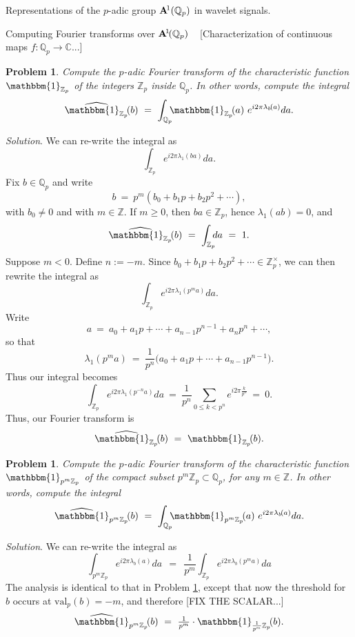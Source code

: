 \documentclass[letterpaper,11pt, reqno]{amsart}
\newtheorem{monodromy theorem}{Monodromy Theorem}[subsection]
\newtheorem{wild conjecture}[theorem]{Wild Conjecture}
\newtheorem{research objectives}{Research objectives}[subsection]
\newtheorem{research question}[theorem]{Research questions}
\newtheorem{aside question}[theorem]{Aside question}
\newtheorem{problem}[theorem]{Problem}
\newtheorem{audio example}[theorem]{\loudspeaker[3] Example}
\newtheorem{blank remark}[theorem]{}
\newtheorem{terminology and comment}[theorem]{Terminology and comment}
\newtheorem{purity hypothesis}[theorem]{Purity hypothesis}
\newtheorem{corollary of the purity hypothesis}[theorem]{Corollary of the purity hypothesis}
\newcommand{\CC} {{\mathbb C}}
\newcommand{\QQ} {{\mathbb Q}}
\newcommand{\ZZ} {{\mathbb Z}}
\newcommand{\lra}{{\longrightarrow}}
\numberwithin{equation}{theorem}
\begin{document}
\begin{section}{Representations of the $p$-adic group $\bold{A}^{\!1}(\mathbb{Q}_{p})$ in wavelet signals.}
\begin{subsection}{Computing Fourier transforms over $\bold{A}^{\!1\!}(\QQ_{p})$}
\ 
{\color{red} [Characterization of continuous maps $f:\QQ_{p}\lra\CC$...]}

\begin{problem}\label{problem: Fourier 1}
\normalfont
Compute the $p$-adic Fourier transform of the characteristic function $\mathbbm{1}_{\ZZ_p}$ of the integers $\ZZ_{p}$ inside $\QQ_{p}$. In other words, compute the integral
	$$\widehat{\mathbbm{1}_{\ZZ_{p}}}\!(b)
	\ =\ 
	\int_{\QQ_{p}}\!\!\!\mathbbm{1}_{\ZZ_{p}}\!(a)\ e^{i2\pi\lambda_{b\!}(a)}da.
	$$
\end{problem}

\noindent
{\em Solution}.
We can re-write the integral as
	$$
	\int_{\ZZ_{p}}e^{i2\pi\lambda_{1\!}(ba)}da.
	$$
Fix $b\in\QQ_{p}$ and write
	$$
	b\ =\ p^{m}(b_{0}+b_1 p+b_2p^2+\cdots),
	$$
with $b_0\neq 0$ and with $m\in\ZZ$. If $m\ge 0$, then $ba\in \ZZ_p$, hence $\lambda_{1}(ab)=0$, and
	$$
	\widehat{\mathbbm{1}_{\ZZ_{p}}}\!(b)
	\ =\ 
	\int_{\ZZ_p}\!\!\!da
	\ =\ 
	1.
	$$
Suppose $m<0$. Define $n:=-m$. Since $b_{0}+b_1 p+b_2p^2+\cdots\in\ZZ^\times_{p}$, we can then rewrite the integral as
	$$
	\int_{\ZZ_{p}}e^{i2\pi\lambda_{1\!}(p^ma)}da.
	$$
Write
	$$
	a
	\ =\ 
	a_0+a_1p+\cdots+a_{n-1} p^{n-1}+a_{n}p^{n}+\cdots,
	$$
so that
	$$
	\lambda_1(p^m a)
	\ =\ 
	\frac{1}{p^n}\big(a_0+a_1p+\cdots+a_{n-1}p^{n-1}\big).
	$$
Thus our integral becomes
	$$
	\int_{\ZZ_{p}}e^{i2\pi\lambda_{1\!}(p^{-n}a)}da
	\ =\ 
	\frac{1}{p^n}\sum_{0\le k<p^n}\!\!e^{i2\pi\tfrac{k}{p^n}}
	\ =\ 0.
	$$
Thus, our Fourier transform is
	$$
	\widehat{\mathbbm{1}_{\ZZ_{p}}}\!(b)
	\ =\ 
	\mathbbm{1}_{\ZZ_{p}}\!(b).
	$$

\begin{problem}
\normalfont
Compute the $p$-adic Fourier transform of the characteristic function $\mathbbm{1}_{p^{m}\ZZ_{p}}$ of the compact subset $p^{m}\ZZ_{p}\subset\QQ_{p}$, for any $m\in\ZZ$. In other words, compute the integral
	$$\widehat{\mathbbm{1}}_{p^{m}\ZZ_{p}}\!(b)
	\ =\ 
	\int_{\QQ_{p}}\!\!\!\mathbbm{1}_{p^{m}\ZZ_{p}}\!(a)\ e^{i2\pi\lambda_{b\!}(a)}da.
	$$
\end{problem}

\noindent
{\em Solution}.
We can re-write the integral as
	$$
	\int_{p^m\ZZ_{p}}\!\!\!e^{i2\pi\lambda_{b\!}(a)}da
	\ \ =\ \ 
	\frac{1}{p^m}\int_{\ZZ_{p}}\!\!\!e^{i2\pi\lambda_{b\!}(p^ma)}da
	$$
The analysis is identical to that in Problem \ref{problem: Fourier 1}, except that now the threshold for $b$ occurs at $\text{val}_{p}(b)=-m$, and therefore {\color{red} [FIX THE SCALAR...]}
	$$
	\widehat{\mathbbm{1}}_{p^m\ZZ_{p}}\!(b)
	\ =\ 
	\tfrac{1}{p^m}\cdot\mathbbm{1}_{\scalebox{.8}{$\tfrac{1}{p^m}$}\ZZ_{p}}\!(b).
	$$


\end{subsection}
\end{section}
\end{document}

